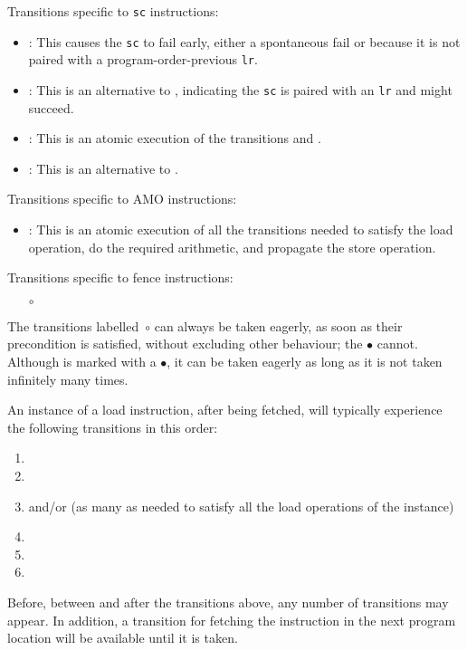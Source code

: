 \noindent Transitions specific to {\tt  sc} instructions:
\begin{itemize}
\item {}: This causes the {\tt sc} to fail early, either a spontaneous fail or because it is not paired with a program-order-previous {\tt lr}.
\item {}: This is an alternative to , indicating the {\tt sc} is paired with an {\tt lr} and might succeed.
\item {}: This is an atomic execution of the transitions  and .
\item {}: This is an alternative to .
\end{itemize}

\noindent Transitions specific to AMO instructions:
\begin{itemize}
\item {}: This is an atomic execution of all the transitions needed to satisfy the load operation, do the required arithmetic, and propagate the store operation.
\end{itemize}

\noindent Transitions specific to fence instructions:
\begin{itemize}
\item[$\circ$] 
\end{itemize}

The transitions labelled~$\circ$ can always be taken eagerly, as soon as their precondition is satisfied, without excluding other behaviour; the $\bullet$ cannot.
Although  is marked with a $\bullet$, it can be taken eagerly as long as it is not taken infinitely many times.

An instance of a load instruction, after being fetched, will typically experience the following transitions in this order:
\begin{enumerate}
\item {}
\item {}
\item {} and/or  (as many as needed to satisfy all the load operations of the instance)
\item {}
\item {}
\item {}
\end{enumerate}
Before, between and after the transitions above, any number of  transitions may appear.
In addition, a  transition for fetching the instruction in the next program location will be available until it is taken.


